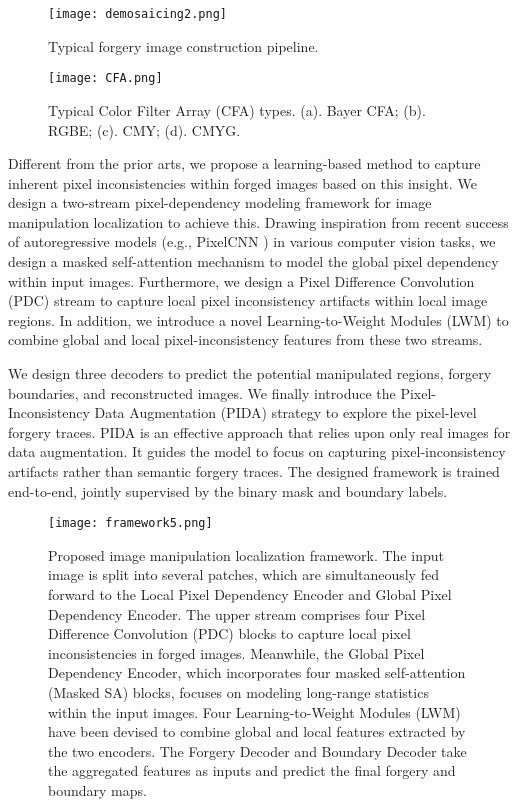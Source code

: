 \documentclass[10pt,journal,compsoc]{IEEEtran}
\begin{document}
\begin{figure}[ht]
\centering
\texttt{[image:  demosaicing2.png]}
\caption{Typical forgery image construction pipeline.}
\label{demosaicing}
\end{figure}

\begin{figure}[ht]
\centering
\texttt{[image:  CFA.png]}
\caption{Typical Color Filter Array (CFA) types. (a). Bayer CFA; (b). RGBE; (c). CMY; (d). CMYG.}
\label{CFA}
\end{figure}

Different from the prior arts, we propose a learning-based method to capture inherent pixel inconsistencies within forged images based on this insight. We design a two-stream pixel-dependency modeling framework for image manipulation localization to achieve this. Drawing inspiration from recent success of autoregressive models (e.g., PixelCNN \cite{van2016pixel, van2016conditional}) in various computer vision tasks, we design a masked self-attention mechanism to model the global pixel dependency within input images. Furthermore, we design a Pixel Difference Convolution (PDC) stream to capture local pixel inconsistency artifacts within local image regions. In addition, we introduce a novel Learning-to-Weight Modules (LWM) to combine global and local pixel-inconsistency features from these two streams.

We design three decoders to predict the potential manipulated regions, forgery boundaries, and reconstructed images. We finally introduce the Pixel-Inconsistency Data Augmentation (PIDA) strategy to explore the pixel-level forgery traces. PIDA is an effective approach that relies upon only real images for data augmentation. It guides the model to focus on capturing pixel-inconsistency artifacts rather than semantic forgery traces. The designed framework is trained end-to-end, jointly supervised by the binary mask and boundary labels.


\begin{figure*}[ht]
\centering
\texttt{[image:  framework5.png]}
\caption{Proposed image manipulation localization framework. The input image is split into several patches, which are simultaneously fed forward to the 
Local Pixel Dependency Encoder and Global Pixel Dependency Encoder. The upper stream comprises four Pixel Difference Convolution (PDC) blocks to capture local pixel inconsistencies in forged images. Meanwhile, the Global Pixel Dependency Encoder, which incorporates four masked self-attention (Masked SA) blocks, focuses on modeling long-range statistics within the input images. Four Learning-to-Weight Modules (LWM) have been devised to combine global and local features extracted by the two encoders. The Forgery Decoder and Boundary Decoder take the aggregated features as inputs and predict the final forgery and boundary maps.  
}
\label{framework}
\end{figure*}
\end{document}
